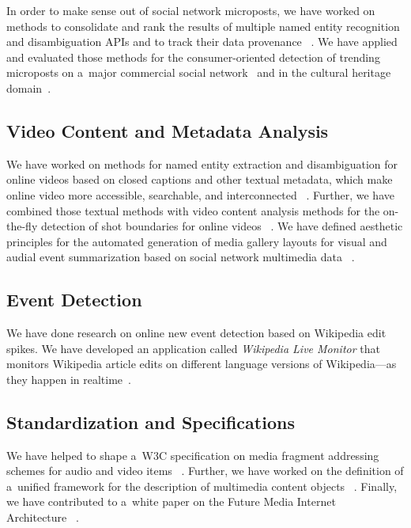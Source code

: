 In order to make sense out of social network microposts,
we have worked on methods to consolidate and rank
the results of multiple named entity recognition and
disambiguation APIs and to track their data provenance~%
\cite{steiner2011addingmeaning,steiner2013addingmeaning}.
We have applied and evaluated those methods
for the consumer-oriented detection of trending microposts
on a~major commercial social network~%
\cite{steiner2011tweetconsumers} and in the cultural heritage domain~\cite{van2013named}.

\subsection{Video Content and Metadata Analysis}

We have worked on methods for named entity extraction and
disambiguation for online videos based on closed captions
and other textual metadata, which make online video
more accessible, searchable, and interconnected~%
\cite{steiner2010semwebvid,steiner2010semwebvidchallenge}.
Further, we have combined those textual methods with
video content analysis methods for the on-the-fly detection
of shot boundaries for online videos~%
\cite{steiner2012shotdetection}.
We have defined aesthetic principles
for the automated generation of media gallery layouts
for visual and audial event summarization
based on social network multimedia data~%
\cite{steiner2012definingaesthetic}.

\subsection{Event Detection}

We have done research on online new event detection
based on Wikipedia edit spikes.
We have developed an application called \emph{Wikipedia Live Monitor}
that monitors Wikipedia article edits on different language versions
of Wikipedia---as they happen in realtime~\cite{steiner2013mj}.

\subsection{Standardization and Specifications}

We have helped to shape a~W3C specification on media
fragment addressing schemes for audio and video items~%
\cite{troncy2012mediafragments}.
Further, we have worked on the definition of a~unified framework
for the description of multimedia content objects~%
\cite{axenopoulos2012isearch,daras2011unifiedframework}.
Finally, we have contributed to a~white paper on the
Future Media Internet Architecture~%
\cite{alduan2011futureinternet}.

